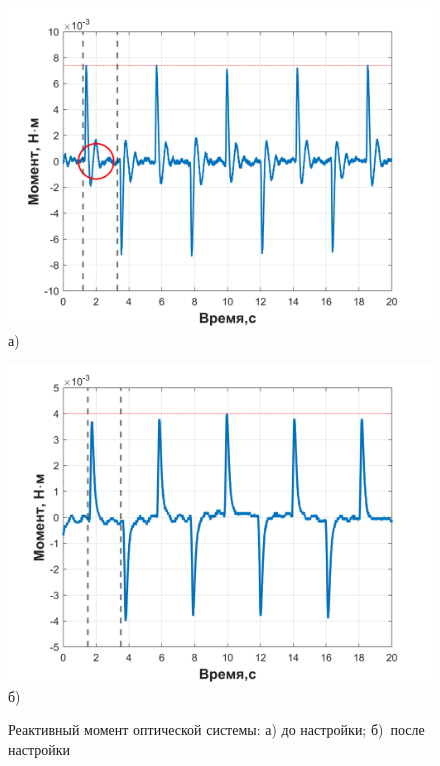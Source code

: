 \begin{figure}[h]
	\begin{minipage}[b]{0.49\linewidth}\centering
		\includegraphics[width=\linewidth]{matlab/img/scanner_no_sinchron} \\ а)
	\end{minipage}
	\hfill
	\begin{minipage}[b]{0.49\linewidth}\centering
		\includegraphics[width=\linewidth]{matlab/img/scanner_correct} \\ б)
	\end{minipage}
	\caption{Реактивный момент оптической системы: а) до настройки; б)~после настройки}
	\label{fig:scan-mom}
\end{figure}

